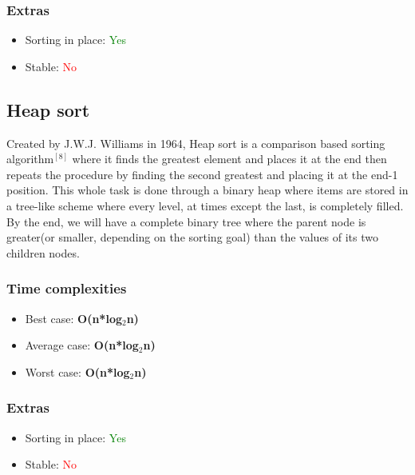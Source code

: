 \documentclass{article}
\begin{document}
\begin{multicols}{2}
\subsubsection{Extras}
\begin{itemize}
    \item Sorting in place: \textcolor{green}{Yes}
    \item Stable: \textcolor{red}{No}
\end{itemize}

\bigbreak \bigbreak \bigbreak \bigbreak \bigbreak \bigbreak \bigbreak \bigbreak \bigbreak \bigbreak \bigbreak \bigbreak \bigbreak \bigbreak \bigbreak \bigbreak \bigbreak \bigbreak \bigbreak \bigbreak


\subsection{Heap sort}
Created by J.W.J. Williams in 1964, Heap sort is a comparison based sorting algorithm$^{[8]}$ where it  finds the greatest element and places it at the end then repeats the procedure by finding the second greatest and placing it at the end-1 position. This whole task is done through a binary heap where items are stored in a tree-like scheme where every level, at times except the last, is completely filled. By the end, we will have a complete binary tree where the parent node is greater(or smaller, depending on the sorting goal) than the values of its two children nodes.
\subsubsection{Time complexities}
\begin{itemize}
    \item Best case: \textbf{O(n*log$_2$n)}
    \item Average case: \textbf{O(n*log$_2$n)}
    \item Worst case: \textbf{O(n*log$_2$n)}
\end{itemize}

\subsubsection{Extras}
\begin{itemize}
    \item Sorting in place: \textcolor{green}{Yes}
    \item Stable: \textcolor{red}{No}
\end{itemize}


\end{multicols}
\end{document}
